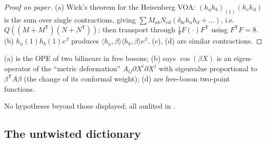\begin{proof}[Proof on paper]
(a) Wick's theorem for the Heisenberg VOA: $(h_ah_b)_{(1)}(h_ch_d)$ is the sum over single contractions,
giving $\sum M_{ab}N_{cd}(\delta_{bc}h_ah_d+\dots)$, i.e.\ $Q((M+M^{\mathsf T})(N+N^{\mathsf T}))$; then
transport through $\tfrac18F(\cdot)F^{\mathsf T}$ using $F^{\mathsf T}F=8$.  (b) $h_a(1)h_b(1)e^\beta$ produces
$\langle h_a,\beta\rangle\langle h_b,\beta\rangle e^\beta$.  (c), (d) are similar contractions.
\end{proof}
\begin{physics}
(a) is the OPE of two bilinears in free bosons; (b) says $\cos(\beta X)$ is an eigen-operator of the
``metric deformation'' $A_{ij}\partial X^i\partial X^j$ with eigenvalue proportional to
$\beta^{\mathsf T}A\beta$ (the change of its conformal weight); (d) are free-boson two-point functions.
\end{physics}
\begin{status}
No hypotheses beyond those displayed; all audited in .
\end{status}

\subsection{The untwisted dictionary}

